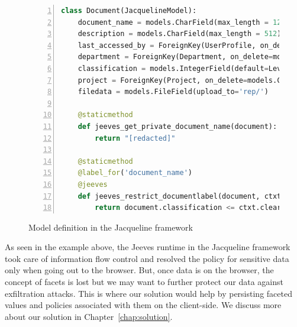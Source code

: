 \begin{figure}
\begin{lstlisting}[language=Python, frame=single, breaklines=true, keywordstyle=\color{keywords}, stringstyle=\color{red}, identifierstyle=\color{darkgray}, procnamekeys={def,class}, basicstyle=\footnotesize\ttfamily, numbers=left, extendedchars=true, tabsize=2]
class Document(JacquelineModel):
    document_name = models.CharField(max_length = 128)
    description = models.CharField(max_length = 512)
    last_accessed_by = ForeignKey(UserProfile, on_delete=models.CASCADE)
    department = ForeignKey(Department, on_delete=models.CASCADE)
    classification = models.IntegerField(default=Levels.TOP_SECRET)
    project = ForeignKey(Project, on_delete=models.CASCADE)
    filedata = models.FileField(upload_to='rep/')

    @staticmethod
    def jeeves_get_private_document_name(document):
        return "[redacted]"

    @staticmethod
    @label_for('document_name')
    @jeeves
    def jeeves_restrict_documentlabel(document, ctxt):
        return document.classification <= ctxt.clearance and document.department == ctxt.department
\end{lstlisting}
\caption{Model definition in the Jacqueline framework}
\label{fig:DRS}
\end{figure}

As seen in the example above, the Jeeves runtime in the Jacqueline framework took
care of information flow control and resolved the policy for sensitive data only
when going out to the browser. But, once data is on the browser, the concept of
facets is lost but we may want to further protect our data against exfiltration
attacks. This is where our solution would help by persisting faceted values and
policies associated with them on the client-side. We discuss more about our solution
in Chapter~\ref{chap:solution}.
